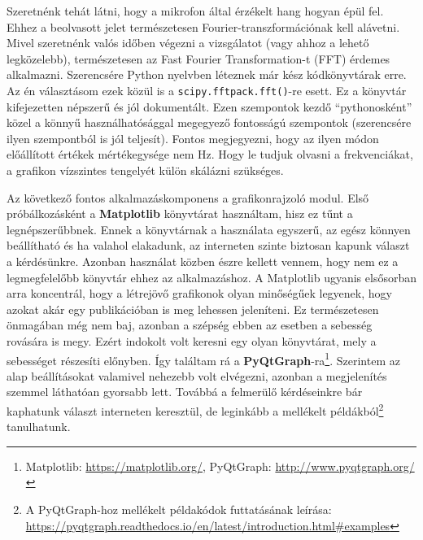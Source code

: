 \documentclass[12pt,a4paper]{article}
\begin{document}
      Szeretnénk tehát látni, hogy a mikrofon által érzékelt hang hogyan épül fel. Ehhez a beolvasott jelet természetesen Fourier-transzformációnak kell alávetni. Mivel szeretnénk valós időben végezni a vizsgálatot (vagy ahhoz a lehető legközelebb), természetesen az Fast Fourier Transformation-t (FFT) érdemes alkalmazni. Szerencsére Python nyelvben léteznek már kész kódkönyvtárak erre. Az én választásom ezek közül is a \texttt{scipy.fftpack.fft()}-re esett. Ez a könyvtár kifejezetten népszerű és jól dokumentált. Ezen szempontok kezdő ``pythonosként'' közel a könnyű használhatósággal megegyező fontosságú szempontok (szerencsére ilyen szempontból is jól teljesít).
      Fontos megjegyezni, hogy az ilyen módon előállított értékek mértékegysége nem Hz. Hogy le tudjuk olvasni a frekvenciákat, a grafikon vízszintes tengelyét külön skálázni szükséges.

      Az következő fontos alkalmazáskomponens a grafikonrajzoló modul. Első próbálkozásként a \textbf{Matplotlib} könyvtárat használtam, hisz ez tűnt a legnépszerűbbnek. Ennek a könyvtárnak a használata egyszerű, az egész könnyen beállítható és ha valahol elakadunk, az interneten szinte biztosan kapunk választ a kérdésünkre. Azonban használat közben észre kellett vennem, hogy nem ez a legmegfelelőbb könyvtár ehhez az alkalmazáshoz. A Matplotlib ugyanis elsősorban arra koncentrál, hogy a létrejövő grafikonok olyan minőségűek legyenek, hogy azokat akár egy publikációban is meg lehessen jeleníteni. Ez természetesen önmagában még nem baj, azonban a szépség ebben az esetben a sebesség rovására is megy. Ezért indokolt volt keresni egy olyan könyvtárat, mely a sebességet részesíti előnyben. Így találtam rá a \textbf{PyQtGraph}-ra\footnote{Matplotlib: \url{https://matplotlib.org/}, PyQtGraph: \url{http://www.pyqtgraph.org/}}. Szerintem az alap beállításokat valamivel nehezebb volt elvégezni, azonban a megjelenítés szemmel láthatóan gyorsabb lett. Továbbá a felmerülő kérdéseinkre bár kaphatunk választ interneten keresztül, de leginkább a mellékelt példákból\footnote{A PyQtGraph-hoz mellékelt példakódok futtatásának leírása: \url{https://pyqtgraph.readthedocs.io/en/latest/introduction.html\#examples}} tanulhatunk.
\end{document}
